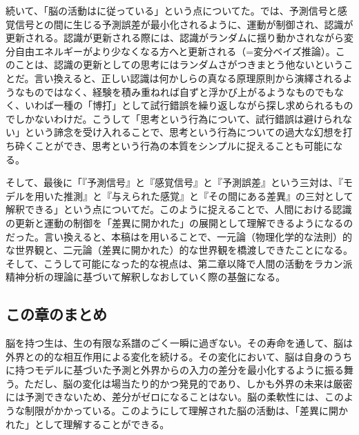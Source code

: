 続いて、「脳の活動はに従っている」という点についてた。では、予測信号と感覚信号との間に生じる予測誤差が最小化されるように、運動が制御され、認識が更新される。認識が更新される際には、認識がランダムに揺り動かされながら変分自由エネルギーがより少なくなる方へと更新される（=変分ベイズ推論）。このことは、認識の更新としての思考にはランダムさがつきまとう他ないということだ。言い換えると、正しい認識は何かしらの真なる原理原則から演繹されるようなものではなく、経験を積み重ねれば自ずと浮かび上がるようなものでもなく、いわば一種の「博打」として試行錯誤を繰り返しながら探し求められるものでしかないわけだ。こうして「思考という行為について、試行錯誤は避けられない」という諦念を受け入れることで、思考という行為についての過大な幻想を打ち砕くことができ、思考という行為の本質をシンプルに捉えることも可能になる。

そして、最後に「『予測信号』と『感覚信号』と『予測誤差』という三対は、『モデルを用いた推測』と『与えられた感覚』と『その間にある差異』の三対として解釈できる」という点についてだ。このように捉えることで、人間における認識の更新と運動の制御を「差異に開かれた」の展開として理解できるようになるのだった。言い換えると、本稿はを用いることで、一元論（物理化学的な法則）的な世界観と、二元論（差異に開かれた）的な世界観を橋渡しできたことになる。そして、こうして可能になった的な視点は、第二章以降で人間の活動をラカン派精神分析の理論に基づいて解釈しなおしていく際の基盤になる。

\subsection{この章のまとめ}\label{ux3053ux306eux7ae0ux306eux307eux3068ux3081}

脳を持つ生は、生の有限な系譜のごく一瞬に過ぎない。その寿命を通して、脳は外界との的な相互作用による変化を続ける。その変化において、脳は自身のうちに持つモデルに基づいた予測と外界からの入力の差分を最小化するように振る舞う。ただし、脳の変化は場当たり的かつ発見的であり、しかも外界の未来は厳密には予測できないため、差分がゼロになることはない。脳の柔軟性には、このような制限がかかっている。このようにして理解された脳の活動は、「差異に開かれた」として理解することができる。
